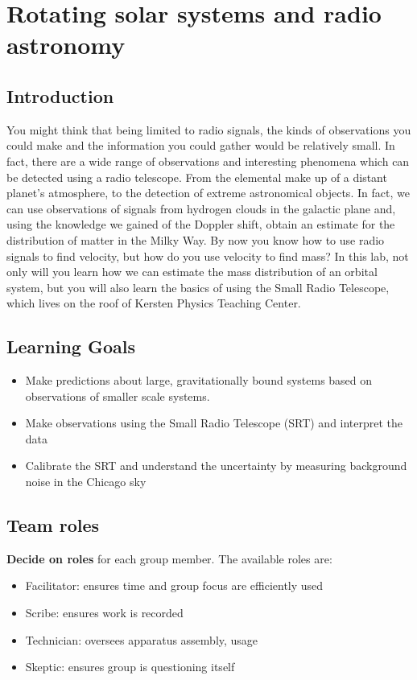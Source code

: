 \chapter{Rotating solar systems and radio astronomy}

\section{Introduction} 
You might think that being limited to radio signals, the kinds of observations you could make and the information you could gather would be relatively small. In fact, there are a wide range of observations and interesting phenomena which can be detected using a radio telescope. From the elemental make up of a distant planet's atmosphere, to the detection of extreme astronomical objects. In fact, we can use observations of signals from hydrogen clouds in the galactic plane and, using the knowledge we gained of the Doppler shift, obtain an estimate for the distribution of matter in the Milky Way. By now you know how to use radio signals to find velocity, but how do you use velocity to find mass? In this lab, not only will you learn how we can estimate the mass distribution of an orbital system, but you will also learn the basics of using the Small Radio Telescope, which lives on the roof of Kersten Physics Teaching Center.

\section{Learning Goals}
\begin{itemize}
	\item Make predictions about large, gravitationally bound systems based on observations of smaller scale systems.
	
	\item Make observations using the Small Radio Telescope (SRT) and interpret the data
	
	\item Calibrate the SRT and understand the uncertainty by measuring background noise in the Chicago sky 
\end{itemize}

\section{Team roles}

\textbf{Decide on roles} for each group member. The available roles are:

\begin{itemize}
	\item Facilitator: ensures time and group focus are efficiently used
	\item Scribe: ensures work is recorded
	\item Technician: oversees apparatus assembly, usage
	\item Skeptic: ensures group is questioning itself
\end{itemize}

